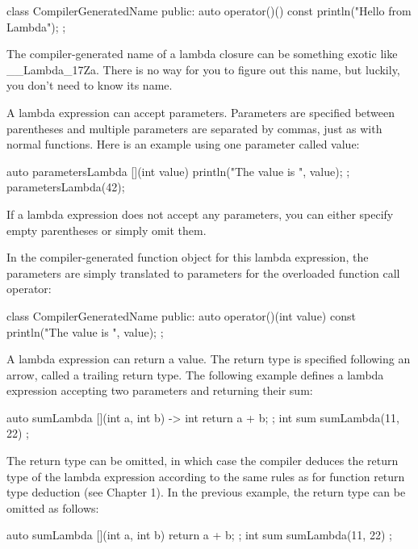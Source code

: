 \begin{cpp}
class CompilerGeneratedName
{
    public:
        auto operator()() const { println("Hello from Lambda"); }
};
\end{cpp}

The compiler-generated name of a lambda closure can be something exotic like \_\_Lambda\_17Za. There is no way for you to figure out this name, but luckily, you don’t need to know its name.

A lambda expression can accept parameters. Parameters are specified between parentheses and multiple parameters are separated by commas, just as with normal functions. Here is an example using one parameter called value:

\begin{cpp}
auto parametersLambda { [](int value){ println("The value is {}", value); } };
parametersLambda(42);
\end{cpp}

If a lambda expression does not accept any parameters, you can either specify empty parentheses or simply omit them.

In the compiler-generated function object for this lambda expression, the parameters are simply translated to parameters for the overloaded function call operator:

\begin{cpp}
class CompilerGeneratedName
{
    public:
        auto operator()(int value) const { println("The value is {}", value); }
};
\end{cpp}

A lambda expression can return a value. The return type is specified following an arrow, called a trailing return type. The following example defines a lambda expression accepting two parameters and returning their sum:

\begin{cpp}
auto sumLambda { [](int a, int b) -> int { return a + b; } };
int sum { sumLambda(11, 22) };
\end{cpp}

The return type can be omitted, in which case the compiler deduces the return type of the lambda expression according to the same rules as for function return type deduction (see Chapter 1). In the previous example, the return type can be omitted as follows:

\begin{cpp}
auto sumLambda { [](int a, int b){ return a + b; } };
int sum { sumLambda(11, 22) };
\end{cpp}

